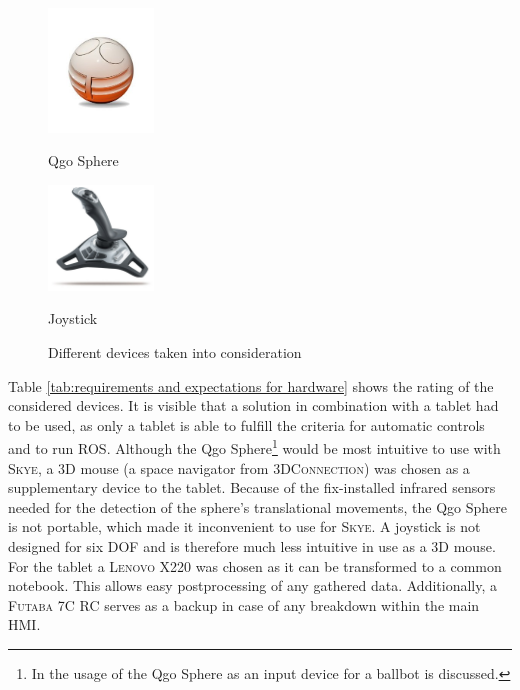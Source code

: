 \begin{figure}[h]
{\begin{center}
			\vspace{0.005\textwidth}
			\hspace{0.05\textwidth}			
			\parbox[b]{0.25\textwidth}{\includegraphics[width=0.25\textwidth]{qgo_sphere_cut}
			\begin{center}Qgo Sphere \end{center}}
			\hspace{0.05\textwidth}
			\parbox[b]{0.25\textwidth}{\includegraphics[width=0.25\textwidth]{Logitech-Freedom-Cordless-Joystick}
			\begin{center}Joystick \end{center}}
			\caption[Different devices taken into consideration]{Different devices taken into consideration}
			\label{fig:devices taken into consideration}	
		\end{center}
	}			
	\vspace{4.5mm}
\end{figure}

Table \ref{tab:requirements and expectations for hardware} shows the rating of the considered devices. It is visible that a solution in combination with a tablet had to be used, as only a tablet is able to fulfill the criteria for automatic controls and to run \textsc{ROS}. Although the Qgo Sphere\footnote{In  \cite{kammermann} the usage of the Qgo Sphere as an input device for a ballbot is discussed.} would be most intuitive to use with \textsc{Skye}, a 3D mouse (a space navigator from \textsc{3DConnection}) was chosen as a supplementary device to the tablet. Because of the fix-installed infrared sensors needed for the detection of the sphere's translational movements, the Qgo Sphere is not portable, which made it inconvenient to use for \textsc{Skye}. A joystick is not designed for six DOF and is therefore much less intuitive in use as a 3D mouse. For the tablet a \textsc{Lenovo} X220 was chosen as it can be transformed to a common notebook. This allows easy postprocessing of any gathered data. Additionally, a \textsc{Futaba} 7C RC serves as a backup in case of any breakdown within the main HMI.


